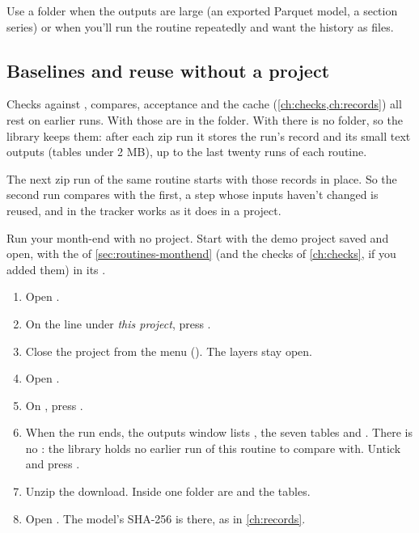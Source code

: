Use a folder when the outputs are large (an exported Parquet model, a section series) or when you'll run the routine repeatedly and want the history as files.

\subsection{Baselines and reuse without a project}
Checks against , compares, acceptance and the cache (\cref{ch:checks,ch:records}) all rest on earlier runs. With  those are in the folder. With  there is no folder, so the library keeps them: after each zip run it stores the run's record and its small text outputs (tables under 2 MB), up to the last twenty runs of each routine.

The next zip run of the same routine starts with those records in place. So the second run compares with the first, a step whose inputs haven't changed is reused, and  in the tracker works as it does in a project.

\begin{tryit}
Run your month-end with no project. Start with the demo project saved and open, with the  of \cref{sec:routines-monthend} (and the checks of \cref{ch:checks}, if you added them) in its .
\begin{enumerate}
\item Open .
\item On the  line under \emph{this project}, press .
\item Close the project from the  menu (). The layers stay open.
\item Open .
\item On , press .
\item When the run ends, the outputs window lists , the seven tables and . There is no : the library holds no earlier run of this routine to compare with. Untick  and press .
\item Unzip the download. Inside one folder are  and the tables.
\item Open . The model's SHA-256 is there, as in \cref{ch:records}.
\end{enumerate}
\end{tryit}

